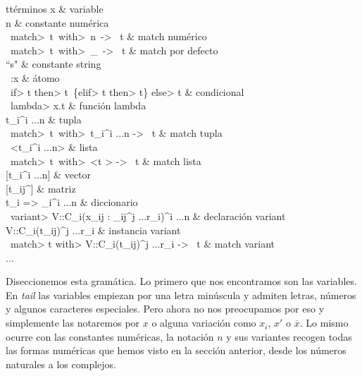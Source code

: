 \smallskip
\hspace*{-3cm}
\begin{grammar}{t}{términos}
x             & variable \\
n             & constante numérica \\
\ \<match>\ t\ \<with>\ n\ \mathligsoff -> \mathligson\ t & match numérico \\
\ \<match>\ t\ \<with>\ \_\ \mathligsoff -> \mathligson\ t & match por defecto \\
``s"         & constante string \\
\ :x            & átomo \\
\ \<if> t \<then> t\ \{\<elif> t \<then> t\} \<else> t & condicional \\
\ \<lambda> x.t     & función lambda \\
t_i^{i ...n} & tupla \\
\ \<match>\ t\ \<with>\ t_i^{i ...n} \mathligsoff -> \mathligson\ t & match tupla \\
\ <t_i^{i ...n}> & lista \\
\ \<match>\ t\ \<with>\ <t \mid {}> \mathligsoff -> \mathligson\ t & match lista \\
{} [{t_i}^{i ...n}] & vector \\
{} [t_{ij}^{}] & matriz \\
{t_i => _i}^{i ...n} & diccionario\\
\ \<variant> V::C_i({x_{ij} : \tau_{ij}}^{j ...r_i})^{i ...n} & declaración variant \\
{V::C_i(t_{ij})}^{j ...r_i} & instancia variant \\
\ \<match> t \<with> {V::C_i(t_{ij})}^{j ...r_i} \mathligsoff -> \mathligson\ t & match variant \\
... \\
\end{grammar}
\smallskip
\smallskip


Diseccionemos esta gramática. Lo primero que nos encontramos son las variables. En \textit{tail} las variables empiezan por una letra minúscula y admiten letras, números y algunos caracteres especiales. Pero ahora no nos preocupamos por eso y simplemente las notaremos por $x$ o alguna variación como $x_i$, $x'$ o $\overline{x}$. Lo mismo ocurre con las constantes numéricas, la notación $n$ y sus variantes recogen todas las formas numéricas que hemos visto en la sección anterior, desde los números naturales a los complejos.\\

